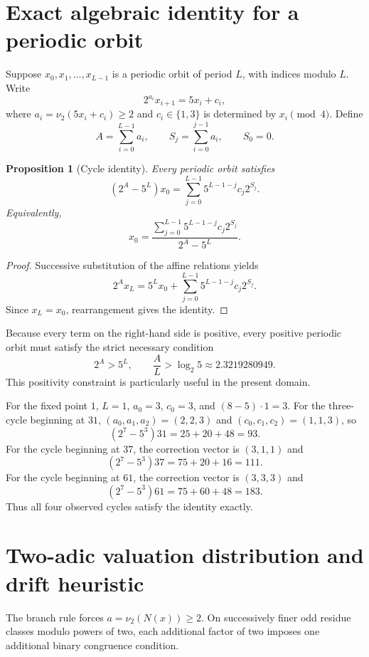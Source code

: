 \documentclass[11pt]{article}
\newtheorem{proposition}{Proposition}
\newcommand{\vTwo}{\nu_2}
\begin{document}
\section{Exact algebraic identity for a periodic orbit}
Suppose $x_0,x_1,\ldots,x_{L-1}$ is a periodic orbit of period $L$, with indices modulo $L$. Write
\begin{equation}
2^{a_i}x_{i+1}=5x_i+c_i,
\end{equation}
where $a_i=\vTwo(5x_i+c_i)\ge2$ and $c_i\in\{1,3\}$ is determined by $x_i\pmod4$. Define
\[
A=\sum_{i=0}^{L-1}a_i,\qquad S_j=\sum_{i=0}^{j-1}a_i,\qquad S_0=0.
\]

\begin{proposition}[Cycle identity]
Every periodic orbit satisfies
\begin{equation}
(2^A-5^L)x_0=\sum_{j=0}^{L-1}5^{L-1-j}c_j2^{S_j}.
\end{equation}
Equivalently,
\begin{equation}
x_0=\frac{\sum_{j=0}^{L-1}5^{L-1-j}c_j2^{S_j}}{2^A-5^L}.
\end{equation}
\end{proposition}
\begin{proof}
Successive substitution of the affine relations yields
\[
2^A x_L=5^Lx_0+\sum_{j=0}^{L-1}5^{L-1-j}c_j2^{S_j}.
\]
Since $x_L=x_0$, rearrangement gives the identity.
\end{proof}

Because every term on the right-hand side is positive, every positive periodic orbit must satisfy the strict necessary condition
\begin{equation}
2^A>5^L,\qquad \frac{A}{L}>\log_2 5\approx2.3219280949.
\end{equation}
This positivity constraint is particularly useful in the present domain.

For the fixed point $1$, $L=1$, $a_0=3$, $c_0=3$, and $(8-5)\cdot1=3$. For the three-cycle beginning at $31$, $(a_0,a_1,a_2)=(2,2,3)$ and $(c_0,c_1,c_2)=(1,1,3)$, so
\[
(2^7-5^3)31=25+20+48=93.
\]
For the cycle beginning at $37$, the correction vector is $(3,1,1)$ and
\[
(2^7-5^3)37=75+20+16=111.
\]
For the cycle beginning at $61$, the correction vector is $(3,3,3)$ and
\[
(2^7-5^3)61=75+60+48=183.
\]
Thus all four observed cycles satisfy the identity exactly.

\section{Two-adic valuation distribution and drift heuristic}
The branch rule forces $a=\vTwo(N(x))\ge2$. On successively finer odd residue classes modulo powers of two, each additional factor of two imposes one additional binary congruence condition.
\end{document}
